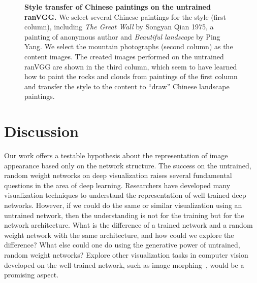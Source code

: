 \documentclass{article}
\begin{document}
\begin{figure}[htbp!]
  \vspace{-4em}
        \vspace{-1em}
\caption{
					\textbf{Style transfer of Chinese paintings on the untrained ranVGG.}
					We select several Chinese paintings for the style (first column),
					including \emph{The Great Wall} by Songyan Qian 1975, a painting of anonymous author
					and \emph{Beautiful landscape} by Ping Yang.
					We select the mountain photographs (second column) as the content images.
					The created images performed on the untrained ranVGG are shown in the third column,
                    which seem to have learned how to paint the rocks and clouds from paintings of the first column and transfer the style to the content to ``draw'' Chinese landscape paintings.
 				}
\label{Fig:ChinesePainting}
\end{figure}




\vspace{-0.5em}
\section{Discussion}


Our work offers a testable hypothesis about the representation of image appearance based only on the network structure.
The success on the untrained, random weight networks on deep visualization raises several fundamental questions in the area of deep learning.
Researchers have developed many visualization techniques to understand the representation of well trained deep networks. However, if we could do the same or similar visualization using an untrained network, then the understanding is not for the training but for the network architecture.
What is the difference of a trained network and a random weight network with the same architecture, and how could we explore the difference?
What else could one do using the generative power of untrained, random weight networks?
Explore other visualization tasks in computer vision developed on the well-trained network, such as image morphing~\cite{Traversal2015}, would be a promising aspect.
\end{document}
